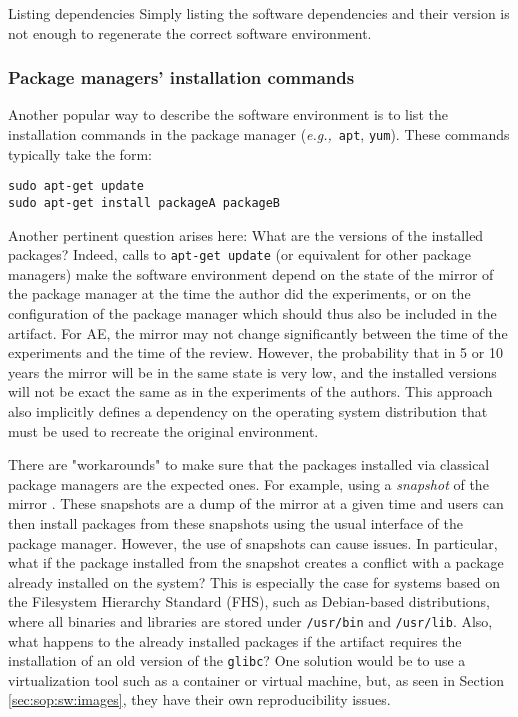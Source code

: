 \documentclass[sigconf,natbib=false]{acmart}
\newcommand{\eg}{\emph{e.g.,}}
\newcommand{\aeval}{AE}
\newcommand{\fmc}[1]{{\color{magenta} #1}} %
\begin{document}
\begin{lesson}{Listing dependencies}{}
  Simply listing the software dependencies and their version is not enough to regenerate the correct software environment.
\end{lesson}

\subsubsection{Package managers' installation commands}

Another popular way to describe the software environment is to list the installation commands in the package manager (\eg\ \texttt{apt}, \texttt{yum}).
These commands typically take the form:

\begin{verbatim}
sudo apt-get update
sudo apt-get install packageA packageB
\end{verbatim}

Another pertinent question arises here: What are the versions of the installed packages?
Indeed, calls to \texttt{apt-get update} (or equivalent for other package managers) make the software environment depend on the state of the mirror of the package manager at the time the author did the experiments, or on the configuration of the package manager which should thus also be included in the artifact.
For \aeval, the mirror may not change significantly between the time of the experiments and the time of the review.
However, the probability that in 5 or 10 years the mirror will be in the same state is very low, and the installed versions will not be exact the same as in the experiments of the authors.
This approach also implicitly defines a dependency on the operating system distribution that must be used to recreate the original environment.

There are "workarounds" to make sure that the packages installed via classical package managers are the expected ones. 
For example, using a \emph{snapshot} of the mirror \cite{debian-snapshot}.
These snapshots are a dump of the mirror at a given time and users can then install packages from these snapshots using the usual interface of the package manager.
However, the use of snapshots can cause issues.
In particular, what if the package installed from the snapshot creates a conflict with a package already installed on the system?
This is especially the case for systems based on the Filesystem Hierarchy Standard (FHS), such as Debian-based distributions, where all binaries and libraries are stored under \texttt{/usr/bin} and \texttt{/usr/lib}.
Also, what happens to the already installed packages if the artifact requires the installation of an old version of the \texttt{glibc}? 
One solution would be to use a virtualization tool such as a container or virtual machine, but, as seen in Section \ref{sec:sop:sw:images}, they have their own reproducibility issues.
\end{document}
